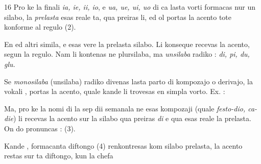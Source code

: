 \begin{VUpage}[20]{16}
Pro ke la finali \textit{ia, ie, ii, io}, e \textit{ua, ue, ui, uo} di ca lasta\nl
vorti formacas nur un silabo, la \textit{prelasta} esas reale ta,\nl
qua preiras li, ed ol portas la acento tote konforme al\nl
regulo (2).

En  ed altri simila,  e  esas vere la\nl
prelasta silabo. Li konseque recevas la acento, segun la\nl
regulo. Nam li kontenas ne plursilaba, ma \textit{unsilaba} radiko :\nl
\textit{di, pi, du, glu.}

Se \textit{monosilaba} (unsilaba) radiko divenas lasta parto di\nl
kompozajo o derivajo, la vokali ,  portas la acento, quale\nl
kande li trovesas en simpla vorto. Ex. : \cc
{}

Ma, pro ke la nomi di la sep dii semanala ne esas kompozaji\nl
(quale \textit{festo-dio, ca-die}) li recevas la acento sur la silabo qua\nl
preiras \textit{di} e qua esas reale la prelasta. On do pronuncas :\nl
{} (3).

Kande ,  formacanta diftongo (4) renkontresas kom\nl
silabo prelasta, la acento restas sur ta diftongo, kun la chefa
\parplein
\end{VUpage}

